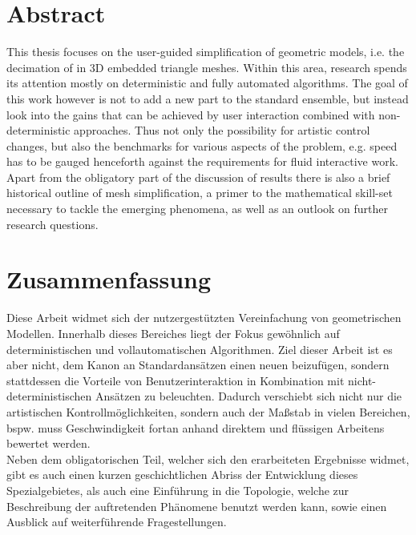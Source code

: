 \vspace*{1ex}
\section*{Abstract}
\label{abstract}

This thesis focuses on the user-guided simplification of geometric models, i.e. the decimation of in 3D embedded triangle meshes.
Within this area, research spends its attention mostly on deterministic and fully automated algorithms.
The goal of this work however is not to add a new part to the standard ensemble, but instead look into the gains that can be achieved by user interaction combined with non-deterministic approaches.
Thus not only the possibility for artistic control changes, but also the benchmarks for various aspects of the problem, e.g. speed has to be gauged henceforth against the requirements for fluid interactive work.\\
Apart from the obligatory part of the discussion of results there is also a brief historical outline of mesh simplification, a primer to the mathematical skill-set necessary to tackle the emerging phenomena, as well as an outlook on further research questions.\\[1ex]

\section*{Zusammenfassung}
\label{zusammenfassung}

Diese Arbeit widmet sich der nutzergestützten Vereinfachung von geometrischen Modellen.
Innerhalb dieses Bereiches liegt der Fokus gewöhnlich auf deterministischen und vollautomatischen Algorithmen.
Ziel dieser Arbeit ist es aber nicht, dem Kanon an Standardansätzen einen neuen beizufügen, sondern stattdessen die Vorteile von Benutzerinteraktion in Kombination mit nicht-deterministischen Ansätzen zu beleuchten. 
Dadurch verschiebt sich nicht nur die artistischen Kontrollmöglichkeiten, sondern auch der Maßstab in vielen Bereichen, bspw. muss Geschwindigkeit fortan anhand direktem und flüssigen Arbeitens bewertet werden.\\
Neben dem obligatorischen Teil, welcher sich den erarbeiteten Ergebnisse widmet, gibt es auch einen kurzen geschichtlichen Abriss der Entwicklung dieses Spezialgebietes, als auch eine Einführung in die Topologie, welche zur Beschreibung der auftretenden Phänomene benutzt werden kann, sowie einen Ausblick auf weiterführende Fragestellungen. 
